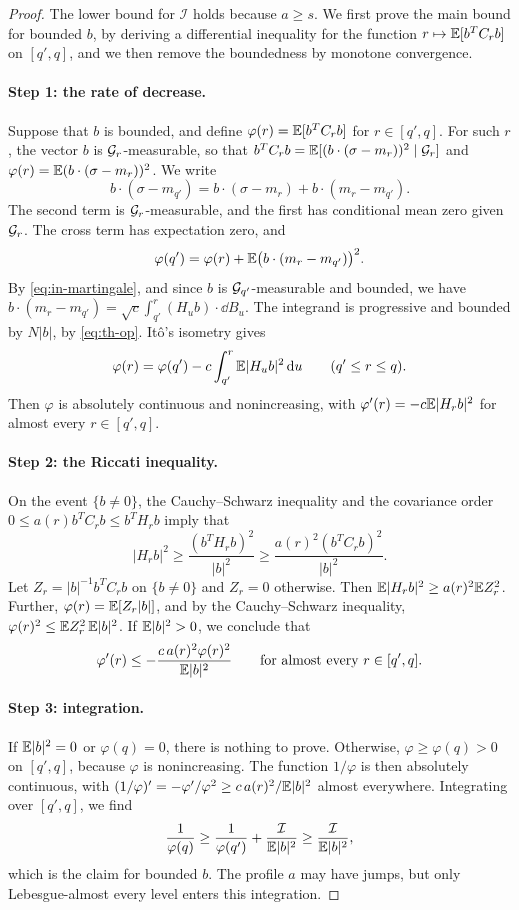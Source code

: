 \begin{proof}
The lower bound for $\mathcal I$ holds because $a\ge s$. We first prove
the main bound for bounded $b$, by deriving a differential inequality for
the function $r\mapsto\mathbb E[b^TC_rb]$ on $[q',q]$, and we then remove the
boundedness by monotone convergence.

\paragraph{Step 1: the rate of decrease.}
Suppose that $b$ is bounded, and define $\varphi(r)=\mathbb E[b^TC_rb]$ for
$r\in[q',q]$. For such $r$, the vector $b$ is $\mathcal G_r$-measurable, so
that $b^TC_rb=\mathbb E[(b\cdot(\sigma-m_r))^2\mid\mathcal G_r]$ and
$\varphi(r)=\mathbb E(b\cdot(\sigma-m_r))^2$. We write
\[
 b\cdot(\sigma-m_{q'})=b\cdot(\sigma-m_r)+b\cdot(m_r-m_{q'}).
\]
The second term is $\mathcal G_r$-measurable, and the first has conditional
mean zero given $\mathcal G_r$. The cross term has expectation
zero, and
\[
 \varphi(q')=\varphi(r)+\mathbb E\bigl(b\cdot(m_r-m_{q'})\bigr)^2 .
\]
By \eqref{eq:in-martingale}, and since $b$ is $\mathcal G_{q'}$-measurable
and bounded, we have
$b\cdot(m_r-m_{q'})=\sqrt c\int_{q'}^r(H_ub)\cdot\dd B_u$. The integrand
is progressive and bounded by $N|b|$, by \eqref{eq:th-op}. Itô's isometry
gives
\[
 \varphi(r)=\varphi(q')-c\int_{q'}^r\mathbb E|H_ub|^2\,\mathrm d u\qquad(q'\le r\le q).
\]
Then $\varphi$ is absolutely continuous and nonincreasing, with
$\varphi'(r)=-c\mathbb E|H_rb|^2$ for almost every $r\in[q',q]$.

\paragraph{Step 2: the Riccati inequality.}
On the event $\{b\ne0\}$, the Cauchy--Schwarz inequality and the
covariance order $0\le a(r)b^TC_rb\le b^TH_rb$ imply that
\[
 |H_rb|^2\ge\frac{(b^TH_rb)^2}{|b|^2}\ge\frac{a(r)^2(b^TC_rb)^2}{|b|^2}.
\]
Let $Z_r=|b|^{-1}b^TC_rb$ on $\{b\ne0\}$ and $Z_r=0$ otherwise. Then
$\mathbb E|H_rb|^2\ge a(r)^2\mathbb E Z_r^2$. Further, $\varphi(r)=\mathbb E[Z_r|b|]$, and by the
Cauchy--Schwarz inequality, $\varphi(r)^2\le\mathbb E Z_r^2\,\mathbb E|b|^2$. If
$\mathbb E|b|^2>0$, we conclude that
\[
 \varphi'(r)\le-\frac{c\,a(r)^2\varphi(r)^2}{\mathbb E|b|^2}
 \qquad\text{for almost every }r\in[q',q].
\]

\paragraph{Step 3: integration.}
If $\mathbb E|b|^2=0$ or $\varphi(q)=0$, there is nothing to prove. Otherwise,
$\varphi\ge\varphi(q)>0$ on $[q',q]$, because $\varphi$ is nonincreasing.
The function $1/\varphi$ is then absolutely continuous, with
$(1/\varphi)'=-\varphi'/\varphi^2\ge c\,a(r)^2/\mathbb E|b|^2$ almost
everywhere. Integrating over $[q',q]$, we find
\[
 \frac1{\varphi(q)}\ge\frac1{\varphi(q')}+\frac{\mathcal I}{\mathbb E|b|^2}
 \ge\frac{\mathcal I}{\mathbb E|b|^2},
\]
which is the claim for bounded $b$. The profile $a$ may have jumps, but
only Lebesgue-almost every level enters this integration.


\end{proof}
